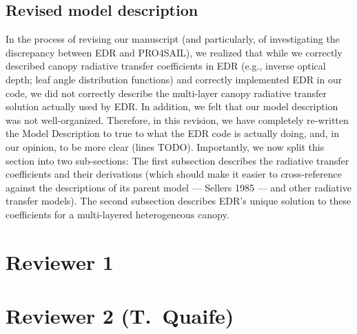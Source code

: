 \documentclass{article}
\begin{document}
\subsection{Revised model description}\label{subsec:model}

In the process of revising our manuscript (and particularly, of investigating the discrepancy between EDR and PRO4SAIL), we realized that while we correctly described canopy radiative transfer coefficients in EDR (e.g., inverse optical depth; leaf angle distribution functions) and correctly implemented EDR in our code,
we did not correctly describe the multi-layer canopy radiative transfer solution actually used by EDR.\@
In addition, we felt that our model description was not well-organized.
Therefore, in this revision, we have completely re-written the Model Description to true to what the EDR code is actually doing, and, in our opinion, to be more clear (lines TODO).
Importantly, we now split this section into two sub-sections:
The first subsection describes the radiative transfer coefficients and their derivations (which should make it easier to cross-reference against the descriptions of its parent model --- Sellers 1985 --- and other radiative transfer models).
The second subsection describes EDR's unique solution to these coefficients for a multi-layered heterogeneous canopy.

\section{Reviewer 1}\label{sec:r1}



\section{Reviewer 2 (T.\ Quaife)}\label{sec:r2}




\end{document}
